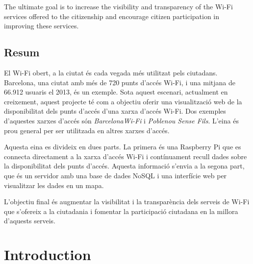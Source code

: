 \documentclass[12pt, a4paper,twoside]{tesi_upf}
\begin{document}
The ultimate goal is to increase the visibility and transparency of the Wi-Fi services offered to the citizenship and encourage citizen participation in improving these services.

\vspace*{\fill}
\section*{\Large \sffamily  Resum}

El Wi-Fi obert, a la ciutat és cada vegada més utilitzat pels ciutadans. 
Barcelona, una ciutat amb més de 720 punts d'accés Wi-Fi, i una mitjana de 66.912 usuaris el 2013, és un exemple. Sota aquest escenari, actualment en creixement, aquest projecte té com a objectiu oferir una visualització web de la disponibilitat dels punts d'accés d'una xarxa d'accés Wi-Fi. Dos exemples d'aquestes xarxes d'accés són \emph{BarcelonaWi-Fi} i \emph{Poblenou Sense Fils}. L'eina és prou general per ser utilitzada en altres xarxes d'accés. 

Aquesta eina es divideix en dues parts. La primera és una Raspberry Pi que es connecta directament a la xarxa d'accés Wi-Fi i contínuament recull dades sobre la disponibilitat dels punts d'accés. Aquesta informació s'envia a la segona part, que és un servidor amb una base de dades NoSQL i una interfície web per visualitzar les dades en un mapa. 

L'objectiu final és augmentar la visibilitat i la transparència dels serveis de Wi-Fi que s'ofereix a la ciutadania i fomentar la participació ciutadana en la millora d'aquests serveis.


\vspace*{\fill}

\cleardoublepage

%


\tableofcontents

\listoffigures

\listoftables


\mainmatter
\chapter{Introduction}
\label{Chapter1}
\end{document}
